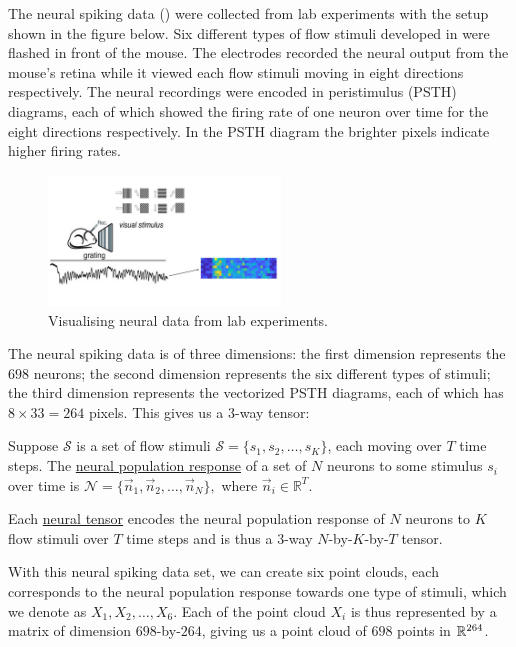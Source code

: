 The neural spiking data (\cite{dyballa_manifold_2021}) were collected from lab experiments with the setup shown in the figure below. Six different types of flow stimuli developed in \cite{visual-flow} were flashed in front of the mouse. The electrodes recorded the neural output from the mouse's retina while it viewed each flow stimuli moving in eight directions respectively. The neural recordings were encoded in peristimulus (PSTH) diagrams, each of which showed the firing rate of one neuron over time for the eight directions respectively. In the PSTH diagram the brighter pixels indicate higher firing rates.
 \begin{figure}[H]
        \centering
            \includegraphics[width=0.55\textwidth]{figures/Slide5.jpg}
            \caption{Visualising neural data from lab experiments.}
    \end{figure}
    
\par The neural spiking data is of three dimensions: the first dimension represents the $698$ neurons; the second dimension represents the six different types of stimuli; the third dimension represents the vectorized PSTH diagrams, each of which has $8\times 33 = 264$ pixels. This gives us a $3$-way tensor:

\begin{defn}
    Suppose $\mathcal{S}$ is a set of flow stimuli $\mathcal{S} = \{s_1, s_2,\dots, s_K\}$, each moving over  $T$ time steps. The \underline{neural population response} of a set of $N$ neurons to some stimulus $s_i$ over time is $\mathcal{N} = \{\vec{n}_1, \vec{n}_2, \dots, \vec{n}_N\},$ where $\vec{n}_i \in \mathbb{R}^{T}$. 

    Each \underline{neural tensor} encodes the neural population response of $N$ neurons to $K$ flow stimuli over $T$ time steps and is thus a $3$-way $N$-by-$K$-by-$T$ tensor.
\end{defn}

With this neural spiking data set, we can create six point clouds, each corresponds to the neural population response towards one type of stimuli, which we denote as $X_1, X_2, \dots,X_6$. Each of the point cloud $X_i$ is thus represented by a matrix of dimension $698$-by-$264$, giving us a point cloud of $698$ points in $\mathbb R^{264}$. 

